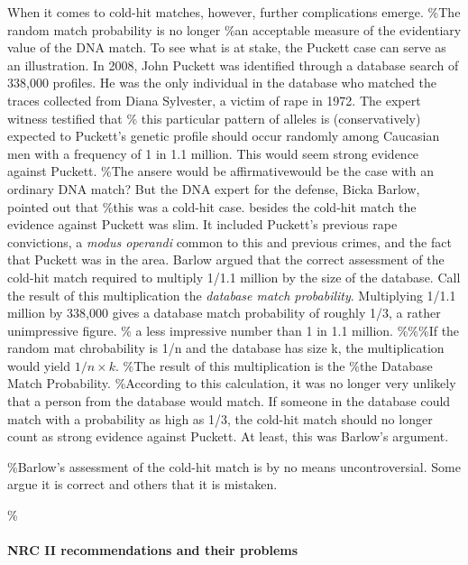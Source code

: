 \documentclass[10pt,dvipsnames,enabledeprecatedfontcommands]{scrartcl}
\let\oldparagraph\paragraph
\renewcommand{\paragraph}[1]{\oldparagraph{#1}\mbox{}}
\begin{document}
When it comes to cold-hit matches, however, further complications
emerge. \%The random match probability is no longer \%an acceptable
measure of the evidentiary value of the DNA match. To see what is at
stake, the Puckett case can serve as an illustration. In 2008, John
Puckett was identified through a database search of 338,000 profiles. He
was the only individual in the database who matched the traces collected
from Diana Sylvester, a victim of rape in 1972. The expert witness
testified that \% this particular pattern of alleles is (conservatively)
expected to Puckett's genetic profile should occur randomly among
Caucasian men with a frequency of 1 in 1.1 million. This would seem
strong evidence against Puckett. \%The ansere would be affirmativewould
be the case with an ordinary DNA match? But the DNA expert for the
defense, Bicka Barlow, pointed out that \%this was a cold-hit case.
besides the cold-hit match the evidence against Puckett was slim. It
included Puckett's previous rape convictions, a \textit{modus operandi}
common to this and previous crimes, and the fact that Puckett was in the
area. Barlow argued that the correct assessment of the cold-hit match
required to multiply 1/1.1 million by the size of the database. Call the
result of this multiplication the \textit{database match probability}.
Multiplying 1/1.1 million by 338,000 gives a database match probability
of roughly 1/3, a rather unimpressive figure. \% a less impressive
number than 1 in 1.1 million. \%\%\%If the random mat chrobability is
1/n and the database has size k, the multiplication would yield
\(1/n\times k\). \%The result of this multiplication is the \%the
Database Match Probability. \%According to this calculation, it was no
longer very unlikely that a person from the database would match. If
someone in the database could match with a probability as high as 1/3,
the cold-hit match should no longer count as strong evidence against
Puckett. At least, this was Barlow's argument.

\%Barlow's assessment of the cold-hit match is by no means
uncontroversial. Some argue it is correct and others that it is
mistaken.

\%\paragraph{NRC II recommendations and their problems}
\end{document}
